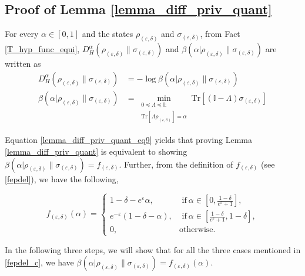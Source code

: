 \documentclass[onecolumn,ldraftcls, 11pt]{IEEEtran}
\newcommand{\tr}{\mathrm{Tr}}
\newcommand{\eps}{\varepsilon}
\newcommand*{\bbI}{\mathbb{I}}
\begin{document}
 \subsection{Proof of Lemma \ref{lemma_diff_priv_quant}}\label{proof_lemma_diff_priv_quant}
    For every $\alpha \in [0,1]$ and the states $\rho_{(\eps,\delta)}$ and $\sigma_{(\eps,\delta)}$, from Fact \ref{T_hyp_func_equi}, 
$D^{\alpha}_{H}(\rho_{(\eps,\delta)}\|\sigma_{(\eps,\delta)})$ 
and $\beta(\alpha|\rho_{(\eps,\delta)}\|\sigma_{(\eps,\delta)})$
are written as
\begin{align}
        D^{\alpha}_{H}(\rho_{(\eps,\delta)}\|\sigma_{(\eps,\delta)}) 
        &= -\log \beta(\alpha|\rho_{(\eps,\delta)}\|\sigma_{(\eps,\delta)})\label{lemma_diff_priv_quant_eq9} \\
\beta(\alpha|\rho_{(\eps,\delta)}\|\sigma_{(\eps,\delta)}) &=  \min_{\substack{0\preceq \Lambda\preceq \bbI :\\ \tr\left[\Lambda \rho_{(\eps,\delta)}\right] = \alpha}}\tr\left[(\bbI-\Lambda )\sigma_{(\eps,\delta)}\right]\label{lemma_diff_priv_quant_eq6}
\end{align}

Equation \eqref{lemma_diff_priv_quant_eq9} yields that proving Lemma \ref{lemma_diff_priv_quant} is equivalent to showing $\beta(\alpha|\rho_{(\eps,\delta)}\|\sigma_{(\eps,\delta)}) = f_{(\eps,\delta)}$. Further, from the definition of $f_{(\eps,\delta)}$ (see \eqref{fepdel}), we have the following,

\begin{equation}
    f_{(\eps,\delta)}(\alpha) = \begin{cases}
        1 - \delta - e^{\eps}\alpha, & \mbox{ if}~ \alpha \in [0,\frac{1-\delta}{e^\eps + 1}], \\
        e^{-\eps}(1 -\delta-\alpha), & \mbox{ if}~ \alpha \in [\frac{1-\delta}{e^\eps + 1},1-\delta],\\
        0 , & \mbox{otherwise}.
    \end{cases}\label{fepdel_c}
\end{equation}

In the following three steps, we will show that for all the three cases mentioned in  \eqref{fepdel_c}, we have $\beta(\alpha|\rho_{(\eps,\delta)}\|\sigma_{(\eps,\delta)}) = f_{(\eps,\delta)}(\alpha)$.
\end{document}
